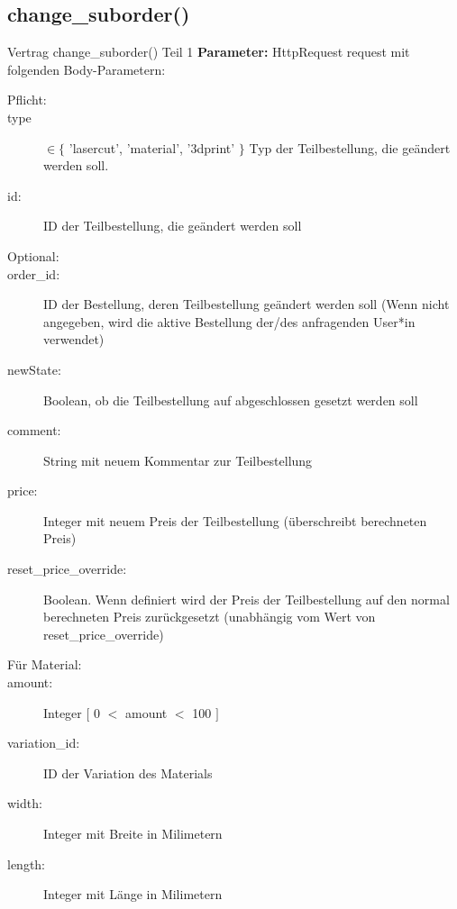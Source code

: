 \documentclass[12pt]{article}
\newcommand{\insetContract}{12pt}
\begin{document}
\subsection{change_suborder()}
\begin{contract}{Vertrag change_suborder() Teil 1}
    \textbf{Parameter:} HttpRequest request mit folgenden Body-Parametern:
    \begin{description}
        \item[Pflicht:]
        \item[\hspace{\insetContract} type] $\in \{$ 'lasercut', 'material', '3dprint' $\}$ Typ der Teilbestellung, die geändert werden soll.
        \item[\hspace{\insetContract} id:] ID der Teilbestellung, die geändert werden soll
        \item[Optional:]
        \item[\hspace{\insetContract} order_id:] ID der Bestellung, deren Teilbestellung geändert werden soll (Wenn nicht angegeben, wird die aktive Bestellung der/des anfragenden User*in verwendet)
        \item[\hspace{\insetContract} newState:] Boolean, ob die Teilbestellung auf abgeschlossen gesetzt werden soll
        \item[\hspace{\insetContract} comment:] String mit neuem Kommentar zur Teilbestellung
        \item[\hspace{\insetContract} price:] Integer mit neuem Preis der Teilbestellung (überschreibt berechneten Preis)
        \item[\hspace{\insetContract} reset_price_override:] Boolean. Wenn definiert wird der Preis der Teilbestellung auf den normal berechneten Preis zurückgesetzt (unabhängig vom Wert von reset_price_override)
        \item[Für Material:] 
        \item[\hspace{\insetContract} amount:] Integer $[$ 0 $<$ amount $<$ 100 $]$
        \item[\hspace{\insetContract} variation_id:] ID der Variation des Materials
        \item[\hspace{\insetContract} width:] Integer mit Breite in Milimetern
        \item[\hspace{\insetContract} length:] Integer mit Länge in Milimetern
    \end{description}
\end{contract}
\end{document}
